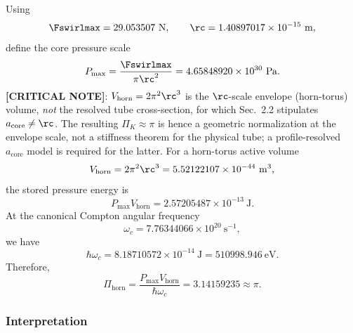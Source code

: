         Using
        \[
            \Fswirlmax = 29.053507\ \mathrm{N},
            \qquad
            \rc = 1.40897017\times10^{-15}\ \mathrm{m},
        \]
        define the core pressure scale
        \begin{equation}
            P_{\max}
            =
            \frac{\Fswirlmax}{\pi \rc^2}
            =
            4.65848920\times10^{30}\ \mathrm{Pa}.
            \label{eq:Pmax_numeric}
        \end{equation}
        \textbf{[CRITICAL NOTE]}: $V_{\mathrm{horn}}=2\pi^2\rc^3$ is the $\rc$-scale envelope (horn-torus) volume, \emph{not} the resolved tube cross-section, for which Sec.~2.2 stipulates $a_{\mathrm{core}}\neq\rc$. The resulting $\Pi_K\approx\pi$ is hence a geometric normalization at the envelope scale, not a stiffness theorem for the physical tube; a profile-resolved $a_{\mathrm{core}}$ model is required for the latter.
        For a horn-torus active volume
        \begin{equation}
            V_{\mathrm{horn}}
            =
            2\pi^2 \rc^3
            =
            5.52122107\times10^{-44}\ \mathrm{m^3},
            \label{eq:horn_volume_numeric}
        \end{equation}
        the stored pressure energy is
        \begin{equation}
            P_{\max}V_{\mathrm{horn}}
            =
            2.57205487\times10^{-13}\ \mathrm{J}.
            \label{eq:pressure_energy_numeric}
        \end{equation}
        At the canonical Compton angular frequency
        \[
            \omega_c
            =
            7.76344066\times10^{20}\ \mathrm{s^{-1}},
        \]
        we have
        \begin{equation}
            \hbar\omega_c
            =
            8.18710572\times10^{-14}\ \mathrm{J}
            =
            510998.946\ \mathrm{eV}.
            \label{eq:hbarOmega_numeric}
        \end{equation}
        Therefore,
        \begin{equation}
            \Pi_{\mathrm{horn}}
            =
            \frac{P_{\max}V_{\mathrm{horn}}}
            {\hbar\omega_c}
            =
            3.14159235
            \approx \pi.
            \label{eq:Pi_horn_numeric}
        \end{equation}
    
    \subsubsection*{Interpretation}
        
